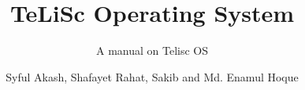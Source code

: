 \documentclass[graybox,envcountchap,sectrefs]{svmono}
\begin{document}
\author{Syful Akash, Shafayet Rahat, Sakib and Md. Enamul Hoque}
\title{TeLiSc Operating System}
\subtitle{A manual on Telisc OS}
\maketitle

\frontmatter%






\tableofcontents




\mainmatter%
%







\backmatter%



\printindex

\end{document}

